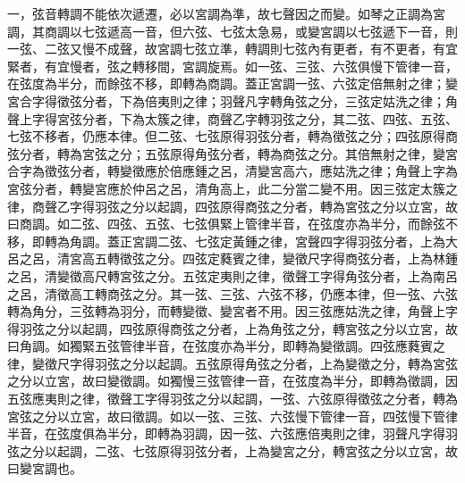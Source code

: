 \begin{pinyinscope}
一，弦音轉調不能依次遞遷，必以宮調為準，故七聲因之而變。如琴之正調為宮調，其商調以七弦遞高一音，但六弦、七弦太急易，或變宮調以七弦遞下一音，則一弦、二弦又慢不成聲，故宮調七弦立準，轉調則七弦內有更者，有不更者，有宜緊者，有宜慢者，弦之轉移間，宮調旋焉。如一弦、三弦、六弦俱慢下管律一音，在弦度為半分，而餘弦不移，即轉為商調。蓋正宮調一弦、六弦定倍無射之律；變宮合字得徵弦分者，下為倍夷則之律；羽聲凡字轉角弦之分，三弦定姑洗之律；角聲上字得宮弦分者，下為太簇之律，商聲乙字轉羽弦之分，其二弦、四弦、五弦、七弦不移者，仍應本律。但二弦、七弦原得羽弦分者，轉為徵弦之分；四弦原得商弦分者，轉為宮弦之分；五弦原得角弦分者，轉為商弦之分。其倍無射之律，變宮合字為徵弦分者，轉變徵應於倍應鍾之呂，清變宮高六，應姑洗之律；角聲上字為宮弦分者，轉變宮應於仲呂之呂，清角高上，此二分當二變不用。因三弦定太簇之律，商聲乙字得羽弦之分以起調，四弦原得商弦之分者，轉為宮弦之分以立宮，故曰商調。如二弦、四弦、五弦、七弦俱緊上管律半音，在弦度亦為半分，而餘弦不移，即轉為角調。蓋正宮調二弦、七弦定黃鍾之律，宮聲四字得羽弦分者，上為大呂之呂，清宮高五轉徵弦之分。四弦定蕤賓之律，變徵尺字得商弦分者，上為林鍾之呂，清變徵高尺轉宮弦之分。五弦定夷則之律，徵聲工字得角弦分者，上為南呂之呂，清徵高工轉商弦之分。其一弦、三弦、六弦不移，仍應本律，但一弦、六弦轉為角分，三弦轉為羽分，而轉變徵、變宮者不用。因三弦應姑洗之律，角聲上字得羽弦之分以起調，四弦原得商弦之分者，上為角弦之分，轉宮弦之分以立宮，故曰角調。如獨緊五弦管律半音，在弦度亦為半分，即轉為變徵調。四弦應蕤賓之律，變徵尺字得羽弦之分以起調。五弦原得角弦之分者，上為變徵之分，轉為宮弦之分以立宮，故曰變徵調。如獨慢三弦管律一音，在弦度為半分，即轉為徵調，因五弦應夷則之律，徵聲工字得羽弦之分以起調，一弦、六弦原得徵弦之分者，轉為宮弦之分以立宮，故曰徵調。如以一弦、三弦、六弦慢下管律一音，四弦慢下管律半音，在弦度俱為半分，即轉為羽調，因一弦、六弦應倍夷則之律，羽聲凡字得羽弦之分以起調，二弦、七弦原得羽弦分者，上為變宮之分，轉宮弦之分以立宮，故曰變宮調也。


\end{pinyinscope}
